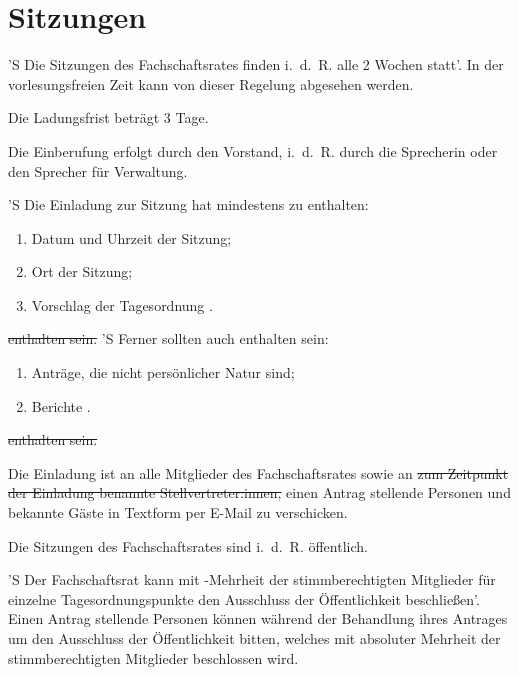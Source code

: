 \documentclass[%
	parskip=half,
]{scrartcl}
\newcounter{enumitem}
\newcommand{\edit}[1]{{\color{red} #1}}
\newcommand{\add}[1]{{\color{blue} #1}}
\newcommand{\delete}[1]{{\color{red} \sout{#1}}}
\begin{document}
\section{Sitzungen}

\begin{contract}


'S Die Sitzungen des Fachschaftsrates finden i.~d.~R. alle 2 Wochen statt'. In der vorlesungsfreien Zeit kann von 
dieser Regelung abgesehen werden.

Die Ladungsfrist beträgt 3 Tage.\label{ladungsfrist}

Die Einberufung erfolgt durch den Vorstand, i.~d.~R. durch \edit{die Sprecherin oder den Sprecher} für Verwaltung.

'S Die Einladung zur Sitzung hat mindestens \add{zu enthalten}:
\begin{enumerate}[\qquad a)]
	\item Datum und \edit{Uhrzeit} der Sitzung;
	\item Ort der Sitzung;
	\item Vorschlag der Tagesordnung\edit{.}
	\setcounter{enumitem}{\value{enumi}}
\end{enumerate}
\delete{enthalten sein.}
'S Ferner sollten auch \add{enthalten sein}:
\begin{enumerate}[\qquad a)]
	\setcounter{enumi}{\value{enumitem}}
	\item Anträge, die nicht persönlicher Natur sind;
	\item Berichte\edit{.}
\end{enumerate}
\delete{enthalten sein.}

Die Einladung ist an alle Mitglieder des Fachschaftsrates sowie an \delete{zum Zeitpunkt der Einladung benannte 
Stellvertreter:innen,} \edit{einen Antrag stellende Personen} und bekannte Gäste in Textform per E-Mail zu verschicken.


Die Sitzungen des Fachschaftsrates sind i.~d.~R. öffentlich.

'S Der Fachschaftsrat kann mit -Mehrheit der stimmberechtigten Mitglieder für einzelne 
Tagesordnungspunkte den Ausschluss der Öffentlichkeit beschließen'. \edit{Einen Antrag stellende Personen können 
während der Behandlung ihres Antrages um den Ausschluss der Öffentlichkeit bitten, welches mit absoluter Mehrheit der 
stimmberechtigten Mitglieder beschlossen wird.}


\end{contract}
\end{document}

